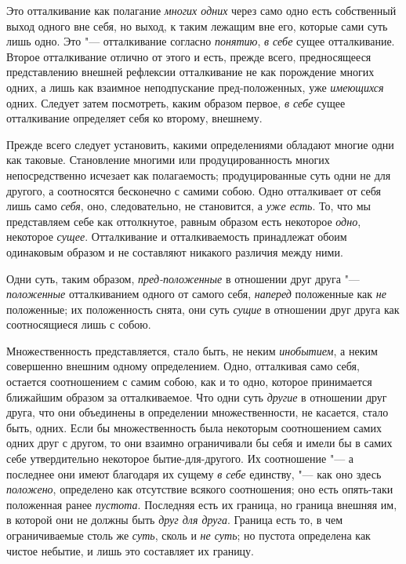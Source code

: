 Это отталкивание как полагание {\em многих одних} через
само одно есть собственный выход одного вне себя, но выход, к таким лежащим
вне его, которые сами суть лишь одно. Это "--- отталкивание согласно
{\em понятию}, {\em в себе} сущее
отталкивание. Второе отталкивание отлично от этого и есть, прежде всего,
предносящееся представлению внешней рефлексии отталкивание не как
порождение многих одних, а лишь как взаимное неподпускание пред-положенных,
уже {\em имеющихся} одних. Следует затем посмотреть,
каким образом первое, {\em в себе} сущее отталкивание
определяет себя ко второму, внешнему.

Прежде всего следует установить, какими определениями обладают многие одни
как таковые. Становление многими или продуцированность многих
непосредственно исчезает как полагаемость; продуцированные суть одни не для
другого, а соотносятся бесконечно с самими собою. Одно отталкивает от себя
лишь само {\em себя}, оно, следовательно, не
становится, а {\em уже есть}. То, что мы представляем
себе как оттолкнутое, равным образом есть некоторое
{\em одно}, некоторое {\em сущее}.
Отталкивание и отталкиваемость принадлежат обоим одинаковым образом и не
составляют никакого различия между ними.

Одни суть, таким образом, {\em пред-положенные} в
отношении друг друга "--- {\em положенные} отталкиванием
одного от самого себя, {\em наперед} положенные как
{\em не} положенные; их положенность снята, они суть
{\em сущие} в отношении друг друга как соотносящиеся лишь с собою.

Множественность представляется, стало быть, не неким
{\em инобытием}, а неким совершенно внешним одному
определением. Одно, отталкивая само себя, остается соотношением с самим
собою, как и то одно, которое принимается ближайшим образом за
отталкиваемое. Что одни суть {\em другие} в отношении
друг друга, что они объединены в определении множественности, не касается,
стало быть, одних. Если бы множественность была некоторым соотношением
самих одних друг с другом, то они взаимно ограничивали бы себя и имели бы в
самих себе утвердительно некоторое бытие-для-другого. Их соотношение "--- а
последнее они имеют благодаря их сущему {\em в себе}
единству, "--- как оно здесь {\em положено}, определено
как отсутствие всякого соотношения; оно есть опять-таки положенная ранее
{\em пустота}. Последняя есть их граница, но граница
внешняя им, в которой они не должны быть {\em друг для
друга}. Граница есть то, в чем ограничиваемые столь же
{\em суть}, сколь и {\em не суть};
но пустота определена как чистое небытие, и лишь это составляет их границу.

